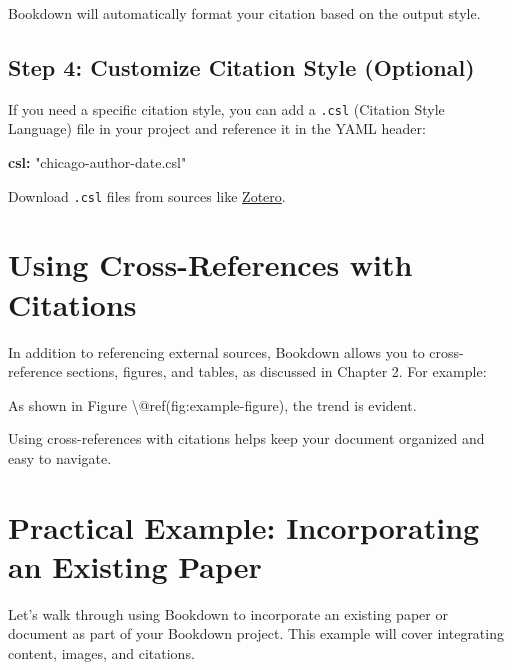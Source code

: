 \documentclass[
]{book}
\newenvironment{Shaded}{\begin{snugshade}}{\end{snugshade}}
\newcommand{\AttributeTok}[1]{\textcolor[rgb]{0.13,0.29,0.53}{#1}}
\newcommand{\FunctionTok}[1]{\textcolor[rgb]{0.13,0.29,0.53}{\textbf{#1}}}
\newcommand{\KeywordTok}[1]{\textcolor[rgb]{0.13,0.29,0.53}{\textbf{#1}}}
\newcommand{\NormalTok}[1]{#1}
\newcommand{\StringTok}[1]{\textcolor[rgb]{0.31,0.60,0.02}{#1}}
\theoremstyle{definition}
\theoremstyle{definition}
\theoremstyle{definition}
\theoremstyle{definition}
\theoremstyle{remark}
\begin{document}
Bookdown will automatically format your citation based on the output style.

\subsection{Step 4: Customize Citation Style (Optional)}\label{step-4-customize-citation-style-optional}

If you need a specific citation style, you can add a \texttt{.csl} (Citation Style Language) file in your project and reference it in the YAML header:

\begin{Shaded}
\begin{Highlighting}[]
\FunctionTok{csl}\KeywordTok{:}\AttributeTok{ }\StringTok{"chicago{-}author{-}date.csl"}
\end{Highlighting}
\end{Shaded}

Download \texttt{.csl} files from sources like \href{https://www.zotero.org/styles}{Zotero}.

\section{Using Cross-References with Citations}\label{using-cross-references-with-citations}

In addition to referencing external sources, Bookdown allows you to cross-reference sections, figures, and tables, as discussed in Chapter 2. For example:

\begin{Shaded}
\begin{Highlighting}[]
\NormalTok{As shown in Figure \textbackslash{}@ref(fig:example{-}figure), the trend is evident.}
\end{Highlighting}
\end{Shaded}

Using cross-references with citations helps keep your document organized and easy to navigate.

\section{Practical Example: Incorporating an Existing Paper}\label{practical-example-incorporating-an-existing-paper}

Let's walk through using Bookdown to incorporate an existing paper or document as part of your Bookdown project. This example will cover integrating content, images, and citations.
\end{document}
